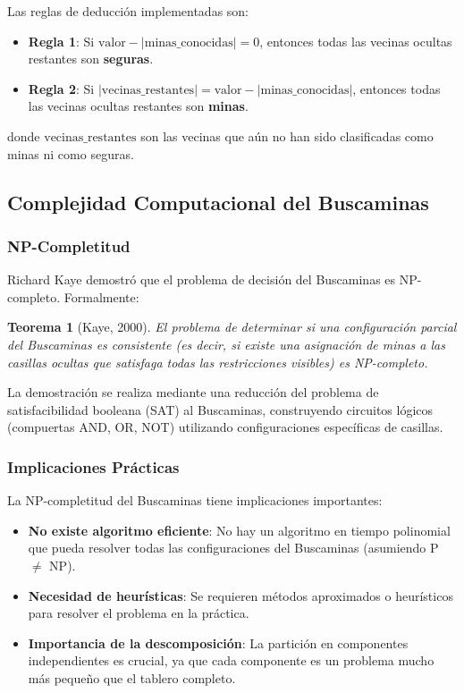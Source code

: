 \documentclass[12pt,a4paper]{article}
\newtheorem{theorem}{Teorema}[section]
\begin{document}
Las reglas de deducción implementadas son:

\begin{itemize}[itemsep=2pt]
    \item \textbf{Regla 1}: Si $\text{valor} - |\text{minas\_conocidas}| = 0$, entonces todas las vecinas ocultas restantes son \textbf{seguras}.
    \item \textbf{Regla 2}: Si $|\text{vecinas\_restantes}| = \text{valor} - |\text{minas\_conocidas}|$, entonces todas las vecinas ocultas restantes son \textbf{minas}.
\end{itemize}

donde $\text{vecinas\_restantes}$ son las vecinas que aún no han sido clasificadas como minas ni como seguras.

\subsection{Complejidad Computacional del Buscaminas}

\subsubsection{NP-Completitud}

Richard Kaye \cite{kaye2000minesweeper} demostró que el problema de decisión del Buscaminas es NP-completo. Formalmente:

\begin{theorem}[Kaye, 2000]
El problema de determinar si una configuración parcial del Buscaminas es consistente (es decir, si existe una asignación de minas a las casillas ocultas que satisfaga todas las restricciones visibles) es NP-completo.
\end{theorem}

La demostración se realiza mediante una reducción del problema de satisfacibilidad booleana (SAT) al Buscaminas, construyendo circuitos lógicos (compuertas AND, OR, NOT) utilizando configuraciones específicas de casillas.

\subsubsection{Implicaciones Prácticas}

La NP-completitud del Buscaminas tiene implicaciones importantes:

\begin{itemize}[itemsep=2pt]
    \item \textbf{No existe algoritmo eficiente}: No hay un algoritmo en tiempo polinomial que pueda resolver todas las configuraciones del Buscaminas (asumiendo P $\neq$ NP).
    \item \textbf{Necesidad de heurísticas}: Se requieren métodos aproximados o heurísticos para resolver el problema en la práctica.
    \item \textbf{Importancia de la descomposición}: La partición en componentes independientes es crucial, ya que cada componente es un problema mucho más pequeño que el tablero completo.
\end{itemize}
\end{document}
